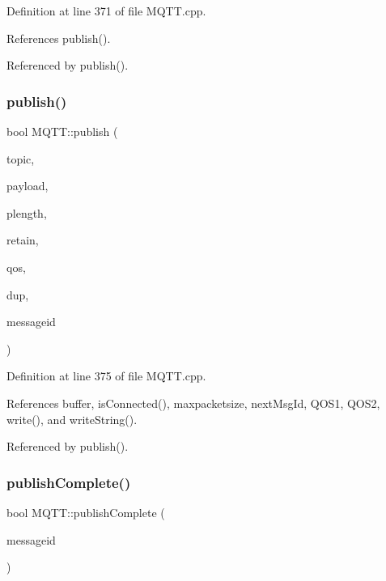 Definition at line 371 of file M\+Q\+T\+T.\+cpp.



References publish().



Referenced by publish().

\mbox{\label{class_m_q_t_t_a11b8368945d62d46acf4e7d41c57e3c3}} 
\subsubsection{\texorpdfstring{publish()}{publish()}\hspace{0.1cm}{\footnotesize\ttfamily [10/10]}}
{\footnotesize\ttfamily bool M\+Q\+T\+T\+::publish (\begin{DoxyParamCaption}\item[{const char $\ast$}]{topic,  }\item[{const uint8\+\_\+t $\ast$}]{payload,  }\item[{unsigned int}]{plength,  }\item[{bool}]{retain,  }\item[{\hyperlink{class_m_q_t_t_aff501e08e20ebf26b3272fcc0e7215ff}{E\+M\+Q\+T\+T\+\_\+\+Q\+OS}}]{qos,  }\item[{bool}]{dup,  }\item[{uint16\+\_\+t $\ast$}]{messageid }\end{DoxyParamCaption})}



Definition at line 375 of file M\+Q\+T\+T.\+cpp.



References buffer, is\+Connected(), maxpacketsize, next\+Msg\+Id, Q\+O\+S1, Q\+O\+S2, write(), and write\+String().



Referenced by publish().

\mbox{\label{class_m_q_t_t_a98364d0b5900925a0466b64b84396b18}} 
\subsubsection{\texorpdfstring{publish\+Complete()}{publishComplete()}}
{\footnotesize\ttfamily bool M\+Q\+T\+T\+::publish\+Complete (\begin{DoxyParamCaption}\item[{uint16\+\_\+t}]{messageid }\end{DoxyParamCaption})\hspace{0.3cm}{\ttfamily [private]}}



